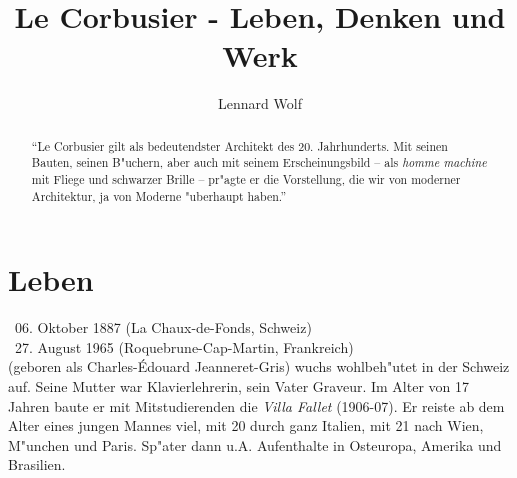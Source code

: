 \documentclass[a4paper]{tufte-handout}
\title{Le Corbusier - Leben, Denken und Werk}%
\author[Lennard Wolf]{Lennard Wolf}
\date{ } %
\begin{document}
\maketitle%


\begin{abstract}
\noindent
"`Le Corbusier gilt als bedeutendster Architekt des 20. Jahrhunderts. Mit seinen Bauten, seinen B"uchern, aber auch mit seinem Erscheinungsbild -- als \emph{homme machine} mit Fliege und schwarzer Brille -- pr"agte er die Vorstellung, die wir von moderner Architektur, ja von Moderne "uberhaupt haben."'\cite{vitracorbusier}
\end{abstract}


\section{Leben}\label{sec:leben}

\textasteriskcentered ~06. Oktober 1887 (La Chaux-de-Fonds, Schweiz)\\
\noindent \textdagger~27. August 1965 (Roquebrune-Cap-Martin, Frankreich)\\

 (geboren als Charles-\'Edouard Jeanneret-Gris) wuchs wohlbeh"utet in der Schweiz auf. Seine Mutter war Klavierlehrerin, sein Vater Graveur. Im Alter von 17 Jahren baute er mit Mitstudierenden die \emph{Villa Fallet} (1906-07). Er reiste ab dem Alter eines jungen Mannes viel, mit 20 durch ganz Italien, mit 21 nach Wien, M"unchen und Paris. Sp"ater dann u.A. Aufenthalte in Osteuropa, Amerika und Brasilien.
\end{document}
